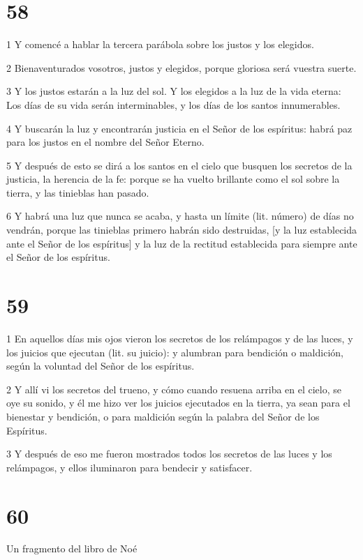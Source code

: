 \chapter{58}

\par 1 Y comencé a hablar la tercera parábola sobre los justos y los elegidos.
\par 2 Bienaventurados vosotros, justos y elegidos, porque gloriosa será vuestra suerte.
\par 3 Y los justos estarán a la luz del sol. Y los elegidos a la luz de la vida eterna: Los días de su vida serán interminables, y los días de los santos innumerables.
\par 4 Y buscarán la luz y encontrarán justicia en el Señor de los espíritus: habrá paz para los justos en el nombre del Señor Eterno.
\par 5 Y después de esto se dirá a los santos en el cielo que busquen los secretos de la justicia, la herencia de la fe: porque se ha vuelto brillante como el sol sobre la tierra, y las tinieblas han pasado.
\par 6 Y habrá una luz que nunca se acaba, y hasta un límite (lit. número) de días no vendrán, porque las tinieblas primero habrán sido destruidas, [y la luz establecida ante el Señor de los espíritus] y la luz de la rectitud establecida para siempre ante el Señor de los espíritus.

\chapter{59}

\par 1 En aquellos días mis ojos vieron los secretos de los relámpagos y de las luces, y los juicios que ejecutan (lit. su juicio): y alumbran para bendición o maldición, según la voluntad del Señor de los espíritus.
\par 2 Y allí vi los secretos del trueno, y cómo cuando resuena arriba en el cielo, se oye su sonido, y él me hizo ver los juicios ejecutados en la tierra, ya sean para el bienestar y bendición, o para maldición según la palabra del Señor de los Espíritus.
\par 3 Y después de eso me fueron mostrados todos los secretos de las luces y los relámpagos, y ellos iluminaron para bendecir y satisfacer.

\chapter{60} Un fragmento del libro de Noé

